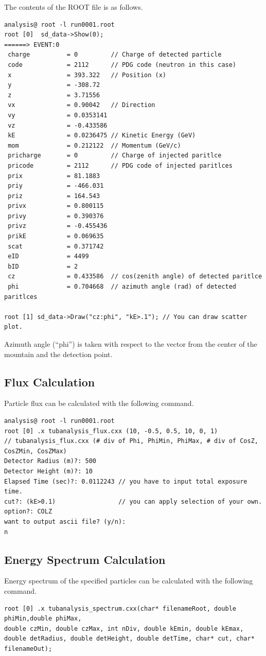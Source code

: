 \documentclass[11pt,a4paper]{jsarticle}
\begin{document}
The contents of the ROOT file is as follows.
\begin{screen}
{\small
\begin{verbatim}
analysis@ root -l run0001.root
root [0]  sd_data->Show(0);
======> EVENT:0
 charge          = 0         // Charge of detected particle
 code            = 2112      // PDG code (neutron in this case)
 x               = 393.322   // Position (x)
 y               = -308.72   
 z               = 3.71556   
 vx              = 0.90042   // Direction
 vy              = 0.0353141
 vz              = -0.433586
 kE              = 0.0236475 // Kinetic Energy (GeV)
 mom             = 0.212122  // Momentum (GeV/c)
 pricharge       = 0         // Charge of injected paritlce
 pricode         = 2112      // PDG code of injected paritlces
 prix            = 81.1883
 priy            = -466.031
 priz            = 164.543
 privx           = 0.800115
 privy           = 0.390376
 privz           = -0.455436
 prikE           = 0.069635
 scat            = 0.371742
 eID             = 4499     
 bID             = 2
 cz              = 0.433586  // cos(zenith angle) of detected paritlce
 phi             = 0.704668  // azimuth angle (rad) of detected paritlces

root [1] sd_data->Draw("cz:phi", "kE>.1"); // You can draw scatter plot.
\end{verbatim}}
\end{screen}
Azimuth angle (``phi'') is taken with respect to the vector from the center of
the mountain and the detection point. 


\subsection{Flux Calculation}
Particle flux can be calculated with the following command.
\begin{screen}
{\small
\begin{verbatim}
analysis@ root -l run0001.root
root [0] .x tubanalysis_flux.cxx (10, -0.5, 0.5, 10, 0, 1) 
// tubanalysis_flux.cxx (# div of Phi, PhiMin, PhiMax, # div of CosZ, CosZMin, CosZMax)
Detector Radius (m)?: 500
Detector Height (m)?: 10
Elapsed Time (sec)?: 0.0112243 // you have to input total exposure time.
cut?: (kE>0.1)                 // you can apply selection of your own.
option?: COLZ
want to output ascii file? (y/n): 
n
\end{verbatim}}
\end{screen}



\subsection{Energy Spectrum Calculation}
Energy spectrum of the specified particles can be calculated with the following command.
\begin{screen}
{\small
\begin{verbatim}
root [0] .x tubanalysis_spectrum.cxx(char* filenameRoot, double phiMin,double phiMax,
double czMin, double czMax, int nDiv, double kEmin, double kEmax,
double detRadius, double detHeight, double detTime, char* cut, char* filenameOut);
\end{verbatim}}
\end{screen}
\end{document}
